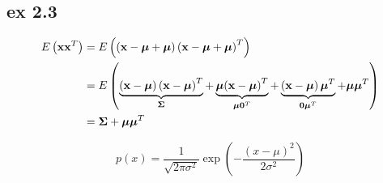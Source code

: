 \documentclass[10pt]{article}
\begin{document}
\subsection{ex 2.3}
\begin{equation}
\begin{split}
E\left( {\mathbf{x}{\mathbf{x}^T}} \right) &= E\left( {\left( {\mathbf{x} - \boldsymbol{\mu}  + \boldsymbol{\mu} } \right){{\left( {\mathbf{x} - \boldsymbol{\mu}  + \boldsymbol{\mu} } \right)}^T}} \right) \hfill \\
&= E\left( {\underbrace {\left( {\mathbf{x} - \boldsymbol{\mu} } \right){{\left( {\mathbf{x} - \boldsymbol{\mu} } \right)}^T}}_{\boldsymbol{\Sigma}}  + \underbrace {\boldsymbol{\mu} {{\left( {\mathbf{x} - \boldsymbol{\mu} } \right)}^T}}_{\boldsymbol{\mu} {\mathbf{0}^T}} + \underbrace {\left( {\mathbf{x} - \boldsymbol{\mu} } \right){\boldsymbol{\mu} ^T}}_{\mathbf{0}{\boldsymbol{\mu} ^T}} + \boldsymbol{\mu} {\boldsymbol{\mu} ^T}} \right) \hfill \\
&= \boldsymbol{\Sigma}  + \boldsymbol{\mu} {\boldsymbol{\mu} ^T} \hfill \\ 
\end{split}
\end{equation}

\[p\left( x \right) = \frac{1}{{\sqrt {2\pi {\sigma ^2}} }}\exp \left( { - \frac{{{{\left( {x - \mu } \right)}^2}}}{{2{\sigma ^2}}}} \right)\]
\end{document}
